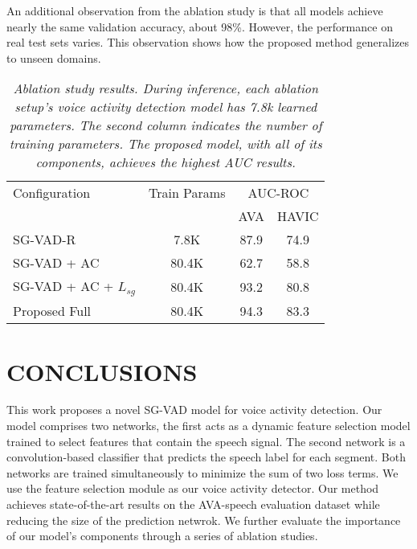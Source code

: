 \documentclass{article}
\begin{document}
An additional observation from the ablation study is that all models achieve nearly the same validation accuracy, about 98\%. However, the performance on real test sets varies. This observation shows how the proposed method generalizes to unseen domains.

\begin{table}[h!]
  \small{
    \begin{tabular}{|l|c|c|c|}
    \hline
        Configuration & Train Params  & \multicolumn{2}{c|}{AUC-ROC}  \\
    
    &  & AVA & HAVIC\\
    \hline
    \hline
    SG-VAD-R  & 7.8K &  87.9  &  74.9  \\
    SG-VAD + AC & 80.4K & 62.7 & 58.8 \\
    SG-VAD + AC + $L_{sg}$ & 80.4K & 93.2 & 80.8 \\
    \hline
    Proposed Full & 80.4K & 94.3 & 83.3 \\
    \hline
    \end{tabular}
    }
  \caption{\textit{Ablation study results. During inference, each ablation setup's voice activity detection model has 7.8k learned parameters. The second column indicates the number of training parameters. The proposed model, with all of its components, achieves the highest AUC results.}} 
   \label{tab:ablation}
\end{table}


\section{CONCLUSIONS}
\label{sec:conclusions}
This work proposes a novel SG-VAD model for voice activity detection. Our model comprises two networks, the first acts as a dynamic feature selection model trained to select features that contain the speech signal. The second network is a convolution-based classifier that predicts the speech label for each segment. Both networks are trained simultaneously to minimize the sum of two loss terms. We use the feature selection module as our voice activity detector. Our method achieves state-of-the-art results on the AVA-speech evaluation dataset while reducing the size of the prediction netwrok. We further evaluate the importance of our model's components through a series of ablation studies. 
\balance


\end{document}
